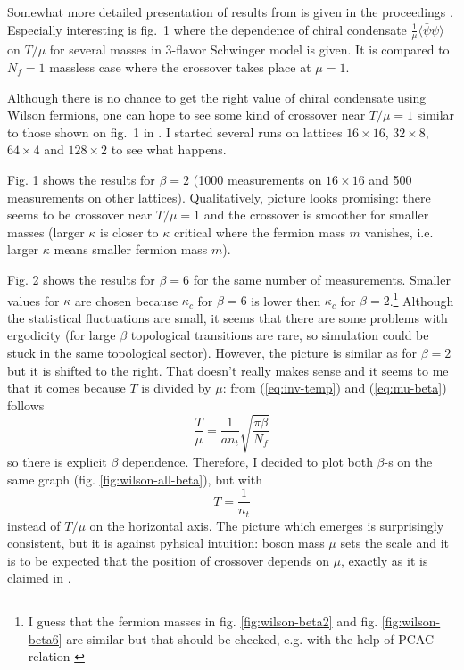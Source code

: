 \documentclass[12pt,a4paper]{article}
\begin{document}
Somewhat more detailed presentation of results from \cite{Hetrick:1995yx} is given in the proceedings \cite{Hosotani:1995gn}. Especially interesting is fig.~1 where the dependence of chiral condensate $\frac{1}{\mu}\langle\bar{\psi}\psi\rangle$ on $T/\mu$ for several masses in 3-flavor Schwinger model is given. It is compared to $N_f = 1$ massless case \cite{Sachs:1991en} where the crossover takes place at $\mu = 1$.

Although there is no chance to get the right value of chiral condensate using Wilson fermions, one can hope to see some kind of crossover near $T/\mu = 1$ similar to those shown on fig.~1 in \cite{Hosotani:1995gn}. I started several runs on lattices $16 \times 16$, $32 \times 8$, $64 \times 4$ and $128 \times 2$ to see what happens.

Fig. 1 shows the results for $\beta = 2$ (1000 measurements on $16 \times 16$ and 500 measurements on other lattices). Qualitatively, picture looks promising: there seems to be crossover near $T/\mu = 1$ and the crossover is smoother for smaller masses (larger $\kappa$ is closer to $\kappa$ critical where the fermion mass $m$ vanishes, i.e. larger $\kappa$ means smaller fermion mass $m$).

Fig. 2 shows the results for $\beta =6$ for the same number of measurements. Smaller values for $\kappa$ are chosen because $\kappa_c$ for $\beta = 6$ is lower then $\kappa_c$ for $\beta = 2$.\footnote{I guess that the fermion masses in fig. \ref{fig:wilson-beta2} and fig. \ref{fig:wilson-beta6} are similar but that should be checked, e.g. with the help of PCAC relation \cite{Hip:1997em,Gattringer:1999gt}} Although the statistical fluctuations are small, it seems that there are some problems with ergodicity (for large $\beta$ topological transitions are rare, so simulation could be stuck in the same topological sector). However, the picture is similar as for $\beta = 2$ but it is shifted to the right. That doesn't really makes sense and it seems to me that it comes because $T$ is divided by $\mu$: from (\ref{eq:inv-temp}) and (\ref{eq:mu-beta}) follows
\begin{equation}
  \frac{T}{\mu} = \frac{1}{a n_t} \sqrt{\frac{\pi \beta}{N_f}} 
\end{equation}
so there is explicit $\beta$ dependence. Therefore, I decided to plot both $\beta$-s on the same graph (fig. \ref{fig:wilson-all-beta}), but with
\begin{equation}
  T = \frac{1}{n_t}
\end{equation}
instead of $T/\mu$ on the horizontal axis. The picture which emerges is surprisingly consistent, but it is against pyhsical intuition: boson mass $\mu$ sets the scale and it is to be expected that the position of crossover depends on $\mu$, exactly as it is claimed in \cite{Hetrick:1995yx,Hosotani:1995gn}.
\end{document}
